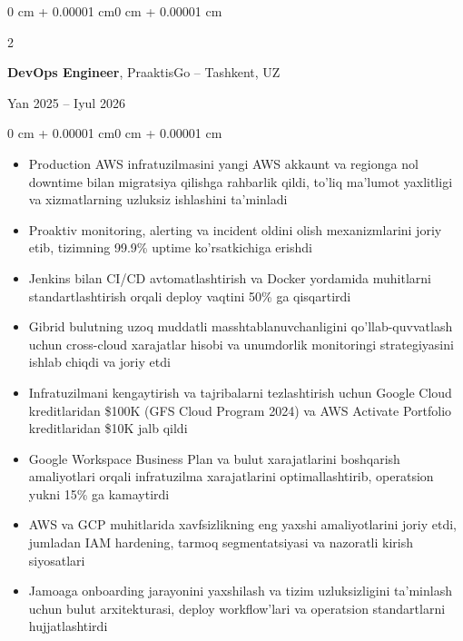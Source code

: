 \documentclass[10pt, letterpaper]{article}
\newenvironment{highlights}{
    \begin{itemize}[
        topsep=0.10 cm,
        parsep=0.10 cm,
        partopsep=0pt,
        itemsep=0pt,
        leftmargin=0 cm + 10pt
    ]
}{
    \end{itemize}
}
\newenvironment{onecolentry}{
    \begin{adjustwidth}{0 cm + 0.00001 cm}{0 cm + 0.00001 cm}
}{
    \end{adjustwidth}
}
\newenvironment{twocolentry}[2][]{
    \onecolentry
    \def\secondColumn{#2}
    \setcolumnwidth{\fill, 4.5 cm}
    \begin{paracol}{2}
}{
    \switchcolumn \raggedleft \secondColumn
    \end{paracol}
    \endonecolentry
}
\begin{document}
    \begin{twocolentry}{Yan 2025 -- Iyul 2026}
        \textbf{DevOps Engineer}, PraaktisGo -- Tashkent, UZ
    \end{twocolentry}
    \vspace{0.10 cm}
    \begin{onecolentry}
        \begin{highlights}
        \item Production AWS infratuzilmasini yangi AWS akkaunt va regionga nol downtime bilan migratsiya qilishga rahbarlik qildi, to'liq ma'lumot yaxlitligi va xizmatlarning uzluksiz ishlashini ta'minladi
        \item Proaktiv monitoring, alerting va incident oldini olish mexanizmlarini joriy etib, tizimning 99.9\% uptime ko'rsatkichiga erishdi
        \item Jenkins bilan CI/CD avtomatlashtirish va Docker yordamida muhitlarni standartlashtirish orqali deploy vaqtini 50\% ga qisqartirdi
        \item Gibrid bulutning uzoq muddatli masshtablanuvchanligini qo'llab-quvvatlash uchun cross-cloud xarajatlar hisobi va unumdorlik monitoringi strategiyasini ishlab chiqdi va joriy etdi
        \item Infratuzilmani kengaytirish va tajribalarni tezlashtirish uchun Google Cloud kreditlaridan \$100K (GFS Cloud Program 2024) va AWS Activate Portfolio kreditlaridan \$10K jalb qildi
        \item Google Workspace Business Plan va bulut xarajatlarini boshqarish amaliyotlari orqali infratuzilma xarajatlarini optimallashtirib, operatsion yukni 15\% ga kamaytirdi
        \item AWS va GCP muhitlarida xavfsizlikning eng yaxshi amaliyotlarini joriy etdi, jumladan IAM hardening, tarmoq segmentatsiyasi va nazoratli kirish siyosatlari
        \item Jamoaga onboarding jarayonini yaxshilash va tizim uzluksizligini ta'minlash uchun bulut arxitekturasi, deploy workflow'lari va operatsion standartlarni hujjatlashtirdi
\end{highlights}
\end{onecolentry}
    \vspace{0.20 cm}
    
\end{document}
